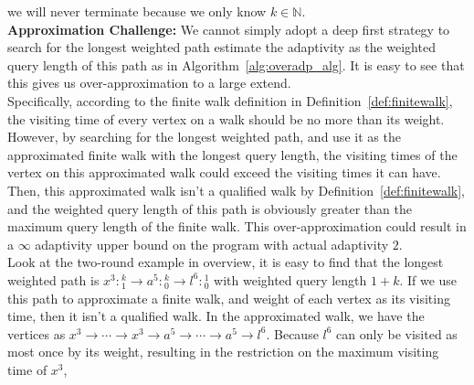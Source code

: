 we will never terminate because we only know $k \in \mathbb{N}$.
\\
\textbf{Approximation Challenge:}
We cannot 
simply adopt a deep first strategy to 
search for the longest weighted path
estimate the adaptivity as the weighted query length of this path
as in Algorithm~\ref{alg:overadp_alg}.
It is easy to see that this gives us over-approximation to a large extend.
\\
Specifically, according to the finite walk definition in Definition~\ref{def:finitewalk},
the visiting time of every vertex on a walk should be no more than its weight.
However, by searching for the longest weighted path, 
and use it as the approximated finite walk with the longest query length, 
the visiting times of the vertex on 
this approximated walk could 
exceed 
the visiting times it can have.
Then, this approximated walk isn't a qualified walk by Definition~\ref{def:finitewalk}, 
and the weighted query length of this path is obviously greater than the maximum query length of the finite walk.
This over-approximation could result in a $\infty$ adaptivity upper bound on the program with actual adaptivity $2$.
\\
Look at the two-round example in overview, 
it is easy to find that the longest weighted path is  $x^3 : {}^{k}_{1} \to a^5 : {}^{k}_{0} \to l^6 : {}^{1}_{0}$ with weighted query length $1 + k$.
If we use this path to approximate a finite walk, and weight of each vertex as
its visiting time,
then it isn't a qualified walk. 
In the approximated walk, we have the vertices as $x^3 \to \cdots \to x^3 \to a^5 \to \cdots \to a^5 \to l^6$.
Because $l^6$ can only be visited as most once by its weight,
resulting in the restriction on the maximum visiting time of $x^3$,
